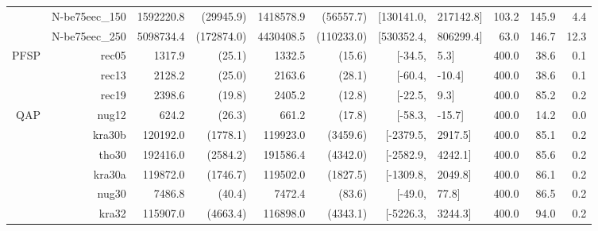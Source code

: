 \documentclass[runningheads]{llncs}
\begin{document}
\begin{table}[tb]
{\begin{tabular}{r@{\hskip -2ex}*{5}{r}rl@{\hskip -2ex}*{3}{r}}
& N-be75eec\_150 & 1592220.8           & (29945.9)          & 1418578.9          & (56557.7)         & [130141.0,           & 217142.8]           & 103.2        & 145.9 & 4.4  \\
& N-be75eec\_250 & 5098734.4           & (172874.0)         & 4430408.5          & (110233.0)        & [530352.4,           & 806299.4]           & 63.0         & 146.7 & 12.3 \\\midrule
PFSP
& rec05          & 1317.9              & (25.1)             & 1332.5             & (15.6)            & [-34.5,              & 5.3]                & 400.0        & 38.6  & 0.1  \\
& rec13          & 2128.2              & (25.0)             & 2163.6             & (28.1)            & [-60.4,              & -10.4]              & 400.0        & 38.6  & 0.1  \\
& rec19          & 2398.6              & (19.8)             & 2405.2             & (12.8)            & [-22.5,              & 9.3]                & 400.0        & 85.2  & 0.2  \\\midrule
QAP
& nug12          & 624.2               & (26.3)             & 661.2              & (17.8)            & [-58.3,              & -15.7]              & 400.0        & 14.2  & 0.0  \\
& kra30b         & 120192.0            & (1778.1)           & 119923.0           & (3459.6)          & [-2379.5,            & 2917.5]             & 400.0        & 85.1  & 0.2  \\
& tho30          & 192416.0            & (2584.2)           & 191586.4           & (4342.0)          & [-2582.9,            & 4242.1]             & 400.0        & 85.6  & 0.2  \\
& kra30a         & 119872.0            & (1746.7)           & 119502.0           & (1827.5)          & [-1309.8,            & 2049.8]             & 400.0        & 86.1  & 0.2  \\
& nug30          & 7486.8              & (40.4)             & 7472.4             & (83.6)            & [-49.0,              & 77.8]               & 400.0        & 86.5  & 0.2  \\
& kra32          & 115907.0            & (4663.4)           & 116898.0           & (4343.1)          & [-5226.3,            & 3244.3]             & 400.0        & 94.0  & 0.2  \\
\bottomrule
\end{tabular}}
\vspace*{-1em}
 \end{table}
\end{document}

